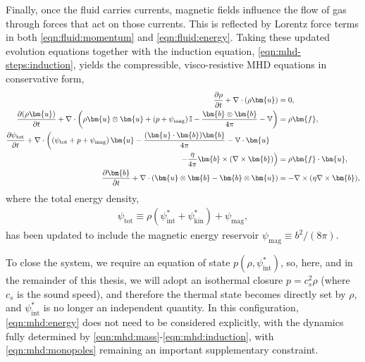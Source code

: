 \documentclass[12pt,twoside]{extreport}
\newcommand{\rbrac}[1]{\left( #1 \right)} %
\newcommand{\mCurl}[1]{\nabla \times #1} %
\newcommand{\mVector}[1]{\bm{#1}} %
\newcommand{\mTensor}[1]{\mathbb{#1}} %
\newcommand{\mpp}[1]{\partial #1}
\newcommand{\mppFrac}[2]{\frac{\mpp{#1}}{\mpp{#2}}}
\newcommand{\nquad}[1][1]{\hspace*{#1em}\ignorespaces}
\begin{document}
Finally, once the fluid carries currents, magnetic fields influence the flow of gas through forces that act on those currents. This is reflected by Lorentz force terms in both \autoref{eqn:fluid:momentum} and \autoref{eqn:fluid:energy}. Taking these updated evolution equations together with the induction equation, \autoref{eqn:mhd-steps:induction}, yields the compressible, visco-resistive MHD equations in conservative form,
\begin{align}
    \mppFrac{\rho}{t} + \nabla \cdot (\rho \mVector{u})
        &= 0
        , \label{eqn:mhd:mass} \\
    \mppFrac{(\rho \mVector{u})}{t}
        + \nabla \cdot \rbrac{
            \rho \mVector{u}\otimes\mVector{u}
            + \rbrac{p + \psi_\mathrm{mag}} \mTensor{I}
            - \frac{\mVector{b}\otimes\mVector{b}}{4\pi}
            - \mTensor{V}
        }
        &= \rho \mVector{f}
        , \label{eqn:mhd:momentum} \\
    \mppFrac{\psi_\mathrm{tot}}{t}
        + \nabla \cdot \left(
            \rbrac{\psi_\mathrm{tot} + p + \psi_\mathrm{mag}} \mVector{u}
            - \frac{(\mVector{u}\cdot\mVector{b})\mVector{b}}{4\pi}
            - \mTensor{V}\cdot\mVector{u}
            \right.\nonumber\nquad[1]&\\
            \left.
            - \frac{\eta}{4\pi} \mVector{b}\times(\mCurl{\mVector{b}})
        \right)
        &= \rho \mVector{f} \cdot \mVector{u}
        , \label{eqn:mhd:energy} \\
    \mppFrac{\mVector{b}}{t}
        + \nabla \cdot \rbrac{
            \mVector{u}\otimes\mVector{b} - \mVector{b}\otimes\mVector{u}
        }
        &= -\mCurl{(\eta \mCurl{\mVector{b}})}
        , \label{eqn:mhd:induction}
\end{align}
where the total energy density,
\begin{align}
    \psi_\mathrm{tot}
        \equiv \rho\rbrac{
                \psi^{*}_\mathrm{int}
                + \psi^{*}_\mathrm{kin}
            }
            + \psi_\mathrm{mag}
    ,
\end{align}
has been updated to include the magnetic energy reservoir $\psi_\mathrm{mag} \equiv b^2 / (8\pi)$.

To close the system, we require an equation of state $p(\rho, \psi^{*}_\mathrm{int})$, so, here, and in the remainder of this thesis, we will adopt an isothermal closure $p = c_s^2 \rho$ (where $c_s$ is the sound speed), and therefore the thermal state becomes directly set by $\rho$, and $\psi^{*}_\mathrm{int}$ is no longer an independent quantity. In this configuration, \autoref{eqn:mhd:energy} does not need to be considered explicitly, with the dynamics fully determined by \autoref{eqn:mhd:mass}-\ref{eqn:mhd:induction}, with \autoref{eqn:mhd:monopoles} remaining an important supplementary constraint.
\end{document}
